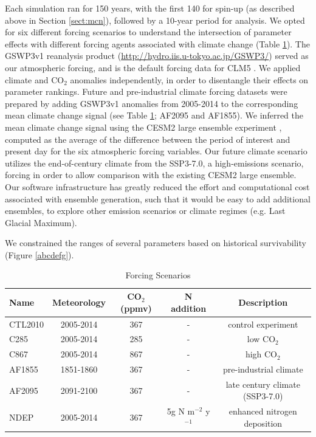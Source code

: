 \documentclass[draft]{agujournal2019}
\begin{document}
Each simulation ran for 150 years, with the first 140 for spin-up (as described above in Section \ref{sect:mcn}), followed by a 10-year period for analysis. We opted for six different forcing scenarios to understand the intersection of parameter effects with different forcing agents associated with climate change (Table \ref{tab:exps}). The GSWP3v1 reanalysis product (\url{http://hydro.iis.u-tokyo.ac.jp/GSWP3/}) served as our atmospheric forcing, and is the default forcing data for CLM5 \cite{lawrence2019}. We applied climate and CO$_2$ anomalies independently, in order to disentangle their effects on parameter rankings. Future and pre-industrial climate forcing datasets were prepared by adding GSWP3v1 anomalies from 2005-2014 to the corresponding mean climate change signal (see Table \ref{tab:exps}; AF2095 and AF1855). We inferred the mean climate change signal using the CESM2 large ensemble experiment \cite{rodgers2021}, computed as the average of the difference between the period of interest and present day for the six atmospheric forcing variables. Our future climate scenario utilizes the end-of-century climate from the SSP3-7.0, a high-emissions scenario, forcing in order to allow comparison with the existing CESM2 large ensemble. Our software infrastructure has greatly reduced the effort and computational cost associated with ensemble generation, such that it would be easy to add additional ensembles, to explore other emission scenarios or climate regimes (e.g. Last Glacial Maximum). 

We constrained the ranges of several parameters based on historical survivability (Figure \ref{abcdefg}). 

\label{sect:exps}
 \begin{table}[h]
 \caption{Forcing Scenarios}
 \centering
 \begin{tabular}{l c c c c}
 \hline
  Name  & Meteorology & CO$_2$ (ppmv) & N addition & Description \\
 \hline
   CTL2010  & 2005-2014 & 367 & - & control experiment\\
   C285        & 2005-2014 & 285 & - & low CO$_2$ \\
   C867        & 2005-2014 & 867 & - & high CO$_2$ \\
   AF1855    & 1851-1860 & 367 & - & pre-industrial climate \\
   AF2095    & 2091-2100 & 367 & - & late century climate (SSP3-7.0) \\
   NDEP      & 2005-2014 & 367 & 5g N m$^{-2}$  y$^{-1}$ & enhanced nitrogen deposition \\
 \hline
 \end{tabular}
 \label{tab:exps}
 \end{table}
\end{document}
